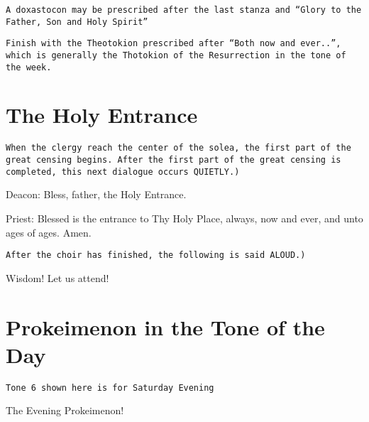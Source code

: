 \documentclass[twoside, letterpaper, 12pt]{report}
\newcommand{\instruction}[1]{%
  \texttt{\scriptsize{#1}}%
}
\newcommand{\centeredsection}[1]{%
  \needspace{10\baselineskip}%
  \section*{\centering{}#1}%
}
\begin{document}
\vbox{}
\instruction{A doxastocon may be prescribed after the last stanza and
``Glory to the Father, Son and Holy Spirit''}

\vbox{}
\instruction{Finish with the Theotokion prescribed after ``Both now and ever..'',
which is generally the Thotokion of the Resurrection in the tone of the week.
}
\cleardoublepage

\centeredsection{The Holy Entrance}

\instruction{When the clergy reach the center of the solea,
the first part of the great censing begins. After the first part of the great
censing is completed, this next dialogue occurs QUIETLY.)}

\vbox{}
{
\footnotesize
Deacon: Bless, father, the Holy Entrance.

Priest: Blessed is the entrance to Thy Holy Place, always, now and ever, and unto ages of ages. Amen.
}

\vbox{}
\instruction{After the choir has finished, the following is said ALOUD.)}

\begin{deacon}
\item Wisdom! Let us attend!
\end{deacon}


\centeredsection{Prokeimenon in the Tone of the Day}

\instruction{Tone 6 shown here is for Saturday Evening}

\begin{deacon}
    \item The Evening Prokeimenon!
\end{deacon}

\end{document}
